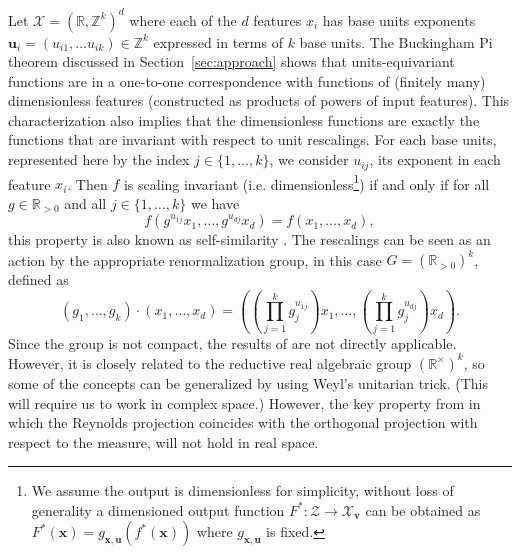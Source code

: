 \documentclass[twoside,11pt]{article}
\newcommand{\sectionname}{Section}
\newcommand{\secref}[1]{\sectionname~\ref{#1}}
\begin{document}
Let $\mathcal X = (\mathbb R, \mathbb Z^k)^d$ where each of the $d$ features $x_i$ has base units exponents $\mathbf u_i = (u_{i1}, \ldots u_{ik})\in \mathbb Z^k$ expressed in terms of $k$ base units. 
The Buckingham Pi theorem discussed in \secref{sec:approach} shows that units-equivariant functions are in a one-to-one correspondence with functions of (finitely many) dimensionless features (constructed as products of powers of input features). 
This characterization also implies that the dimensionless functions are exactly the functions that are invariant with respect to unit rescalings. For each base units, represented here by the index $j\in \{1,\ldots, k\}$, we consider $u_{ij}$, its exponent in each feature $x_i$. Then $f$ is scaling invariant (i.e. dimensionless\footnote{We assume the output is dimensionless for simplicity, without loss of generality a dimensioned output function $F^*:\mathcal Z \to \mathcal X_{\mathbf v}$ can be obtained as $F^*(\mathbf x)=g_{\mathbf x,\mathbf u}(f^*(\mathbf x))$ where $g_{\mathbf x,\mathbf u}$ is fixed.}) if and only if for all $g \in \mathbb R_{>0}$ and all $j\in \{1,\ldots, k\}$ we have
\begin{equation}
    f(g^{u_{1j}} x_1, \ldots, g^{u_{dj}} x_d ) = f(x_1, \ldots, x_d),
\end{equation}  
this property is also known as self-similarity \citep{barenblatt_1996}.
The rescalings can be seen as an action by the appropriate renormalization group, in this case $G=(\mathbb R_{>0})^k$, defined as
\begin{equation}\label{eq.group-action}
(g_1, \ldots, g_k)\cdot (x_1, \ldots, x_d) = \left( (\prod_{j=1}^kg_{j}^{u_{1j}}) x_1, \ldots, (\prod_{j=1}^kg_{j}^{u_{dj}}) x_d   \right).
\end{equation}
Since the group is not compact, the results of \citet{elesedy2021provably} are not directly applicable. However, it is closely related to the reductive real algebraic group $(\mathbb R^\times)^k$, so some of the concepts can be generalized by using Weyl's unitarian trick. (This will require us to work in complex space.) However, the key property from \citet{elesedy2021provably} in which the Reynolds projection coincides with the orthogonal projection with respect to the measure, will not hold in real space.

\end{document}

